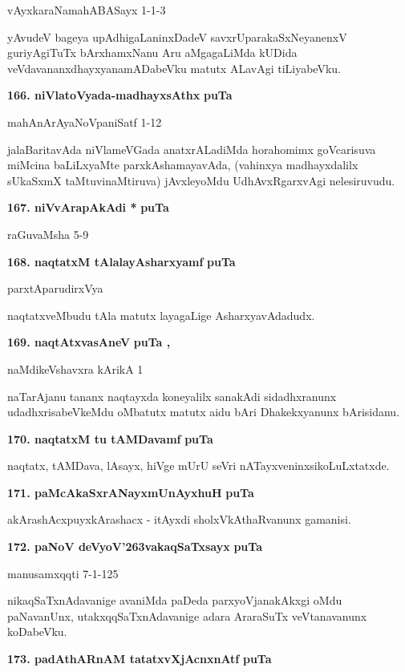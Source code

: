 \hfill{vAyxkaraNamahABASayx 1-1-3}

\smallskip
yAvudeV bageya upAdhigaLaninxDadeV savxrUparakaSxNeyanenxV guriyAgiTuTx bArxhamxNanu Aru aMgagaLiMda kUDida veVdavananxdhayxyanamADabeVku matutx ALavAgi tiLiyabeVku.

\medskip
\noindent
\textbf{166. niVlatoVyada-madhayxsAthx} \hfill{\bf puTa }

\hfill{mahAnArAyaNoVpaniSatf 1-12}

\smallskip
jalaBaritavAda niVlameVGada anatxrALadiMda horahomimx goVcarisuva miMcina baLiLxyaMte parxkAshamayavAda, (vahinxya madhayxdalilx sUkaSxmX taMtuvinaMtiruva) jAvxleyoMdu UdhAvxRgarxvAgi nelesiruvudu.

\medskip
\noindent
\textbf{167. niVvArapAkAdi *} \hfill{\bf puTa }

\hfill{raGuvaMsha 5-9}

\eject

\noindent
\textbf{168. naqtatxM tAlalayAsharxyamf} \hfill{\bf puTa }

\hfill{parxtAparudirxVya}

\smallskip
naqtatxveMbudu tAla matutx layagaLige AsharxyavAdadudx.

\medskip
\noindent
\textbf{169. naqtAtxvasAneV} \hfill{\bf puTa , }

\hfill{naMdikeVshavxra kArikA 1}

\smallskip
naTarAjanu tananx naqtayxda koneyalilx sanakAdi sidadhxranunx udadhxrisabeVkeMdu oMbatutx matutx aidu bAri Dhakekxyanunx bArisidanu.

\medskip
\noindent
\textbf{170. naqtatxM tu tAMDavamf} \hfill{\bf puTa }

\smallskip
naqtatx, tAMDava, lAsayx, hiVge mUrU seVri nATayxveninxsikoLuLxtatxde.

\medskip
\noindent
\textbf{171. paMcAkaSxrANayxmUnAyxhuH} \hfill{\bf puTa }

\smallskip
akArashAcxpuyxkArashacx - itAyxdi sholxVkAthaRvanunx gamanisi.

\medskip
\noindent
\textbf{172. paNoV deVyoV\char'263vakaqSaTxsayx} \hfill{\bf puTa }

\hfill{manusamxqqti 7-1-125}

\smallskip
nikaqSaTxnAdavanige avaniMda paDeda parxyoVjanakAkxgi oMdu paNavanUnx, utakxqqSaTxnAdavanige adara AraraSuTx veVtanavanunx koDabeVku.

\medskip
\noindent
\textbf{173. padAthARnAM tatatxvXjAcnxnAtf} \hfill{\bf puTa }

